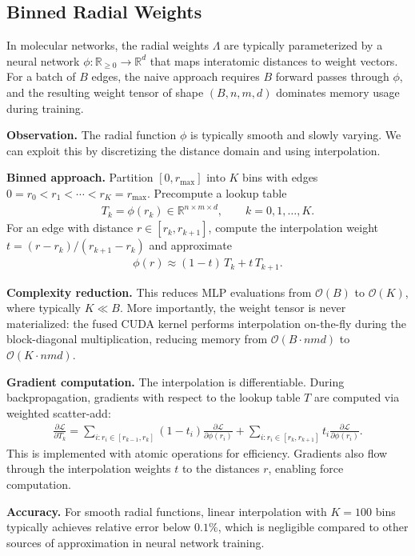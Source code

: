 \documentclass[a4paper, 12pt]{article}
\newcommand{\R}{\mathbb{R}}
\theoremstyle{definition}
\begin{document}
\subsection{Binned Radial Weights}

In molecular networks, the radial weights $\Lambda$ are typically parameterized by a neural network $\phi : \R_{\geq 0} \to \R^d$ that maps interatomic distances to weight vectors. For a batch of $B$ edges, the naive approach requires $B$ forward passes through $\phi$, and the resulting weight tensor of shape $(B, n, m, d)$ dominates memory usage during training.

\textbf{Observation.} The radial function $\phi$ is typically smooth and slowly varying. We can exploit this by discretizing the distance domain and using interpolation.

\textbf{Binned approach.} Partition $[0, r_{\max}]$ into $K$ bins with edges $0 = r_0 < r_1 < \cdots < r_K = r_{\max}$. Precompute a lookup table
\begin{align*}
	T_k = \phi(r_k) \in \R^{n \times m \times d}, \qquad k = 0, 1, \ldots, K.
\end{align*}
For an edge with distance $r \in [r_k, r_{k+1}]$, compute the interpolation weight $t = (r - r_k)/(r_{k+1} - r_k)$ and approximate
\begin{align*}
	\phi(r) \approx (1 - t) \, T_k + t \, T_{k+1}.
\end{align*}

\textbf{Complexity reduction.} This reduces MLP evaluations from $\mathcal{O}(B)$ to $\mathcal{O}(K)$, where typically $K \ll B$. More importantly, the weight tensor is never materialized: the fused CUDA kernel performs interpolation on-the-fly during the block-diagonal multiplication, reducing memory from $\mathcal{O}(B \cdot nmd)$ to $\mathcal{O}(K \cdot nmd)$.

\textbf{Gradient computation.} The interpolation is differentiable. During backpropagation, gradients with respect to the lookup table $T$ are computed via weighted scatter-add:
\begin{align*}
	\frac{\partial \mathcal{L}}{\partial T_k} = \sum_{i : r_i \in [r_{k-1}, r_k]} (1 - t_i) \frac{\partial \mathcal{L}}{\partial \phi(r_i)} + \sum_{i : r_i \in [r_k, r_{k+1}]} t_i \frac{\partial \mathcal{L}}{\partial \phi(r_i)}.
\end{align*}
This is implemented with atomic operations for efficiency. Gradients also flow through the interpolation weights $t$ to the distances $r$, enabling force computation.

\textbf{Accuracy.} For smooth radial functions, linear interpolation with $K = 100$ bins typically achieves relative error below $0.1\%$, which is negligible compared to other sources of approximation in neural network training.
\end{document}
